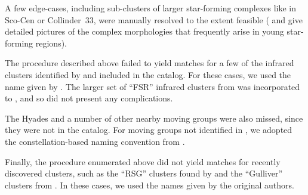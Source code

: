 \documentclass[12pt,twocolumn,tighten,trackchanges]{aastex62}
\begin{document}
A few edge-cases, including sub-clusters of larger
star-forming complexes like in Sco-Cen or Collinder~33, were 
manually resolved to the extent feasible (\citealt{rizzuto_multidimensional_2011}
and \citealt{saurin_isolating_2015} give
detailed pictures of the complex morphologies that frequently arise in
young star-forming regions).

The procedure described above failed to yield matches for a few of the
infrared clusters identified by \citet{majaess_discovering_2013} and
included in the \citet{dias_proper_2014} catalog.
For these cases, we used the name given by \citet{dias_proper_2014}.
The larger set of ``FSR'' infrared clusters from
\citet{froebrich_FSR_2007} was incorporated to
\citet{Kharchenko_et_al_2013}, and so did not present any
complications.

The Hyades and a number of other nearby moving groups were also
missed, since they were not in the \citet{Kharchenko_et_al_2013}
catalog.  For moving groups not identified in
\citet{Kharchenko_et_al_2013}, we adopted the constellation-based
naming convention from \citet{gagne_banyan_XI_2018}.  

Finally, the procedure enumerated above did not yield matches for
recently discovered clusters, such as the ``RSG'' clusters found by
\citet{roser_nine_RSG_2016} and the ``Gulliver'' clusters from
\citet{cantat-gaudin_gaia_2018}.  In these cases, we used the names
given by the original authors.

\listofchanges
\end{document}
